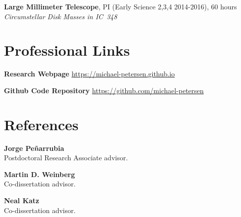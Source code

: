 \documentclass[margin, a4paper,11pt]{res} %
\begin{document}
\begin{resume}
{\bf Large Millimeter Telescope}, PI (Early Science 2,3,4 2014-2016), 60 hours\\
{\it Circumstellar Disk Masses in IC~348}








\section{\sc \textcolor{redshade}{Professional Links}}
{\bf Research Webpage} \url{https://michael-petersen.github.io}

{\bf Github Code Repository} \url{https://github.com/michael-petersen}


\section{\sc \textcolor{redshade}{References}}

{\bf Jorge Pe{\~n}arrubia}\\
Postdoctoral Research Associate advisor.

{\bf Martin D. Weinberg}\\
Co-dissertation advisor.

{\bf Neal Katz}\\
Co-dissertation advisor.

\ifpublicationlist
\pagebreak

\fi

\end{resume}
\end{document}
